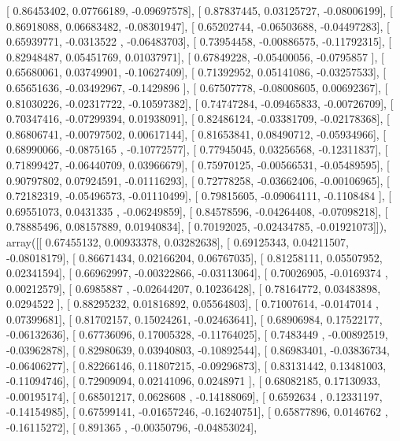 \documentclass{article}
\begin{document}
       [ 0.86453402,  0.07766189, -0.09697578],
       [ 0.87837445,  0.03125727, -0.08006199],
       [ 0.86918088,  0.06683482, -0.08301947],
       [ 0.65202744, -0.06503688, -0.04497283],
       [ 0.65939771, -0.0313522 , -0.06483703],
       [ 0.73954458, -0.00886575, -0.11792315],
       [ 0.82948487,  0.05451769,  0.01037971],
       [ 0.67849228, -0.05400056, -0.0795857 ],
       [ 0.65680061,  0.03749901, -0.10627409],
       [ 0.71392952,  0.05141086, -0.03257533],
       [ 0.65651636, -0.03492967, -0.1429896 ],
       [ 0.67507778, -0.08008605,  0.00692367],
       [ 0.81030226, -0.02317722, -0.10597382],
       [ 0.74747284, -0.09465833, -0.00726709],
       [ 0.70347416, -0.07299394,  0.01938091],
       [ 0.82486124, -0.03381709, -0.02178368],
       [ 0.86806741, -0.00797502,  0.00617144],
       [ 0.81653841,  0.08490712, -0.05934966],
       [ 0.68990066, -0.0875165 , -0.10772577],
       [ 0.77945045,  0.03256568, -0.12311837],
       [ 0.71899427, -0.06440709,  0.03966679],
       [ 0.75970125, -0.00566531, -0.05489595],
       [ 0.90797802,  0.07924591, -0.01116293],
       [ 0.72778258, -0.03662406, -0.00106965],
       [ 0.72182319, -0.05496573, -0.01110499],
       [ 0.79815605, -0.09064111, -0.1108484 ],
       [ 0.69551073,  0.0431335 , -0.06249859],
       [ 0.84578596, -0.04264408, -0.07098218],
       [ 0.78885496,  0.08157889,  0.01940834],
       [ 0.70192025, -0.02434785, -0.01921073]]), array([[ 0.67455132,  0.00933378,  0.03282638],
       [ 0.69125343,  0.04211507, -0.08018179],
       [ 0.86671434,  0.02166204,  0.06767035],
       [ 0.81258111,  0.05507952,  0.02341594],
       [ 0.66962997, -0.00322866, -0.03113064],
       [ 0.70026905, -0.0169374 ,  0.00212579],
       [ 0.6985887 , -0.02644207,  0.10236428],
       [ 0.78164772,  0.03483898,  0.0294522 ],
       [ 0.88295232,  0.01816892,  0.05564803],
       [ 0.71007614, -0.0147014 ,  0.07399681],
       [ 0.81702157,  0.15024261, -0.02463641],
       [ 0.68906984,  0.17522177, -0.06132636],
       [ 0.67736096,  0.17005328, -0.11764025],
       [ 0.7483449 , -0.00892519, -0.03962878],
       [ 0.82980639,  0.03940803, -0.10892544],
       [ 0.86983401, -0.03836734, -0.06406277],
       [ 0.82266146,  0.11807215, -0.09296873],
       [ 0.83131442,  0.13481003, -0.11094746],
       [ 0.72909094,  0.02141096,  0.0248971 ],
       [ 0.68082185,  0.17130933, -0.00195174],
       [ 0.68501217,  0.0628608 , -0.14188069],
       [ 0.6592634 ,  0.12331197, -0.14154985],
       [ 0.67599141, -0.01657246, -0.16240751],
       [ 0.65877896,  0.0146762 , -0.16115272],
       [ 0.891365  , -0.00350796, -0.04853024],
\end{document}
